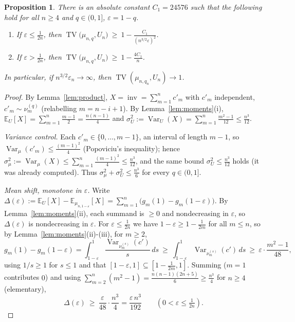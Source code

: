 \documentclass[12pt]{article}
\newtheorem{proposition}{Proposition}
\theoremstyle{definition}
\DeclareMathOperator{\inv}{inv}
\DeclareMathOperator{\TV}{TV}
\DeclareMathOperator{\Var}{Var}
\newcommand{\E}{\mathbb{E}}
\newcommand{\eps}{\varepsilon}
\begin{document}
\begin{proposition}\label{prop:TVlower}
There is an absolute constant $C_1=24576$ such that the following hold for all $n\ge4$
and $q\in(0,1]$, $\eps=1-q$.
\begin{enumerate}
\item[(a)] If $\eps\le\tfrac1{2n}$, then
$\displaystyle \TV\big(\mu_{n,q},U_n\big)\ \ge\ 1-\frac{C_1}{(n^{3/2}\eps)^2}$.
\item[(b)] If $\eps>\tfrac1{2n}$, then
$\displaystyle \TV\big(\mu_{n,q},U_n\big)\ \ge\ 1-\frac{4C_1}{n}$.
\end{enumerate}
In particular, if $n^{3/2}\eps_n\to\infty$, then $\TV(\mu_{n,q_n},U_n)\to1$.
\end{proposition}

\begin{proof}
By Lemma~\ref{lem:product}, $X=\inv=\sum_{m=1}^n c'_m$ with $c'_m$ independent,
$c'_m\sim\nu^{(q)}_m$ (relabelling $m=n-i+1$). By Lemma~\ref{lem:moments}(i),
$\E_U[X]=\sum_{m=1}^n\tfrac{m-1}{2}=\tfrac{n(n-1)}{4}$ and
$\sigma_U^2:=\Var_U(X)=\sum_{m=1}^n\tfrac{m^2-1}{12}\le\tfrac{n^3}{12}$.

\emph{Variance control.} Each $c'_m\in\{0,\dots,m-1\}$, an interval of length $m-1$,
so $\Var_\mu(c'_m)\le\tfrac{(m-1)^2}{4}$ (Popoviciu's inequality); hence
$\sigma_\mu^2:=\Var_\mu(X)\le\sum_{m=1}^n\tfrac{(m-1)^2}{4}\le\tfrac{n^3}{12}$, and the
same bound $\sigma_U^2\le\tfrac{n^3}{12}$ holds (it was already computed). Thus
$\sigma_\mu^2+\sigma_U^2\le\tfrac{n^3}{6}$ for every $q\in(0,1]$.

\emph{Mean shift, monotone in $\eps$.} Write $\Delta(\eps):=\E_U[X]-\E_{\mu_{n,1-\eps}}[X]
=\sum_{m=1}^n\big(g_m(1)-g_m(1-\eps)\big)$. By Lemma~\ref{lem:moments}(ii), each summand
is $\ge0$ and nondecreasing in $\eps$, so $\Delta(\eps)$ is nondecreasing in $\eps$.
For $\eps\le\tfrac1{2n}$ we have $1-\eps\ge1-\tfrac1{2m}$ for all $m\le n$, so by
Lemma~\ref{lem:moments}(ii)-(iii), for $m\ge2$,
\[
g_m(1)-g_m(1-\eps)=\int_{1-\eps}^1\frac{\Var_{\nu^{(s)}_m}(c')}{s}\,ds
\ \ge\ \int_{1-\eps}^1\Var_{\nu^{(s)}_m}(c')\,ds\ \ge\ \eps\cdot\frac{m^2-1}{48},
\]
using $1/s\ge1$ for $s\le1$ and that $[1-\eps,1]\subseteq[1-\tfrac1{2m},1]$. Summing
($m=1$ contributes $0$) and using
$\sum_{m=2}^n(m^2-1)=\tfrac{n(n-1)(2n+5)}{6}\ge\tfrac{n^3}{4}$ for $n\ge4$
(elementary),
\begin{equation}\label{eq:Deltalb}
\Delta(\eps)\ \ge\ \frac{\eps}{48}\cdot\frac{n^3}{4}=\frac{\eps\,n^3}{192}
\qquad(0<\eps\le\tfrac1{2n}).
\end{equation}


\end{proof}
\end{document}
